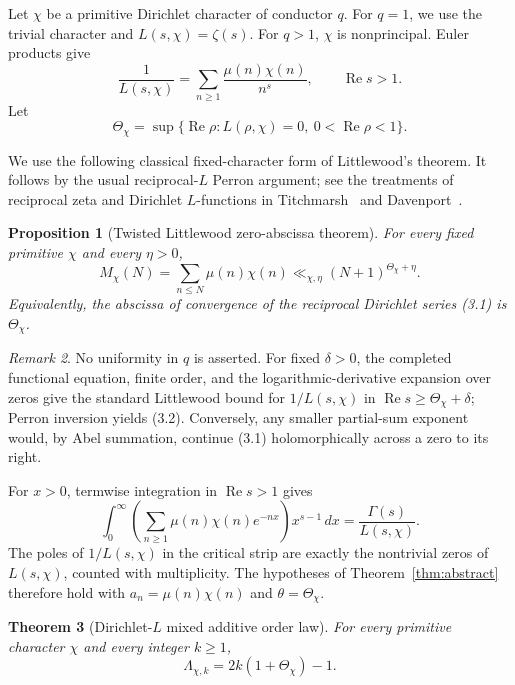 \documentclass[11pt]{article}
\newtheorem{theorem}{Theorem}[section]
\newtheorem{proposition}[theorem]{Proposition}
\theoremstyle{remark}
\newtheorem{remark}[theorem]{Remark}
\newcommand{\Rea}{\operatorname{Re}}
\begin{document}
Let $\chi$ be a primitive Dirichlet character of conductor $q$.  For $q=1$, we use the trivial
character and $L(s,\chi)=\zeta(s)$.  For $q>1$, $\chi$ is nonprincipal.  Euler products give
\begin{equation}
 \frac1{L(s,\chi)}=\sum_{n\geq1}\frac{\mu(n)\chi(n)}{n^s},
 \qquad \Rea s>1.
 \tag{3.1}
\end{equation}
Let
\[
 \Theta_\chi=\sup\{\Rea\rho:L(\rho,\chi)=0,\ 0<\Rea\rho<1\}.
\]

We use the following classical fixed-character form of Littlewood's theorem.  It follows by the
usual reciprocal-$L$ Perron argument; see the treatments of reciprocal zeta and Dirichlet
$L$-functions in Titchmarsh~\cite{Titchmarsh} and Davenport~\cite{Davenport}.

\begin{proposition}[Twisted Littlewood zero-abscissa theorem]
\label{prop:littlewood}
For every fixed primitive $\chi$ and every $\eta>0$,
\begin{equation}
 M_\chi(N)=\sum_{n\leq N}\mu(n)\chi(n)
 \ll_{\chi,\eta}(N+1)^{\Theta_\chi+\eta}.
 \tag{3.2}
\end{equation}
Equivalently, the abscissa of convergence of the reciprocal Dirichlet series (3.1) is
$\Theta_\chi$.
\end{proposition}

\begin{remark}
No uniformity in $q$ is asserted.  For fixed $\delta>0$, the completed functional equation,
finite order, and the logarithmic-derivative expansion over zeros give the standard Littlewood
bound for $1/L(s,\chi)$ in $\Rea s\geq\Theta_\chi+\delta$; Perron inversion yields (3.2).
Conversely, any smaller partial-sum exponent would, by Abel summation, continue (3.1)
holomorphically across a zero to its right.
\end{remark}

For $x>0$, termwise integration in $\Rea s>1$ gives
\begin{equation}
 \int_0^\infty
 \left(\sum_{n\geq1}\mu(n)\chi(n)e^{-nx}\right)x^{s-1}\,dx
 =\frac{\Gamma(s)}{L(s,\chi)}.
 \tag{3.3}
\end{equation}
The poles of $1/L(s,\chi)$ in the critical strip are exactly the nontrivial zeros of
$L(s,\chi)$, counted with multiplicity.  The hypotheses of Theorem~\ref{thm:abstract} therefore
hold with $a_n=\mu(n)\chi(n)$ and $\theta=\Theta_\chi$.

\begin{theorem}[Dirichlet-$L$ mixed additive order law]
\label{thm:dirichlet}
For every primitive character $\chi$ and every integer $k\geq1$,
\begin{equation}
 \boxed{\quad
 \Lambda_{\chi,k}=2k(1+\Theta_\chi)-1.
 \quad}
 \tag{3.4}
\end{equation}
\end{theorem}
\end{document}
